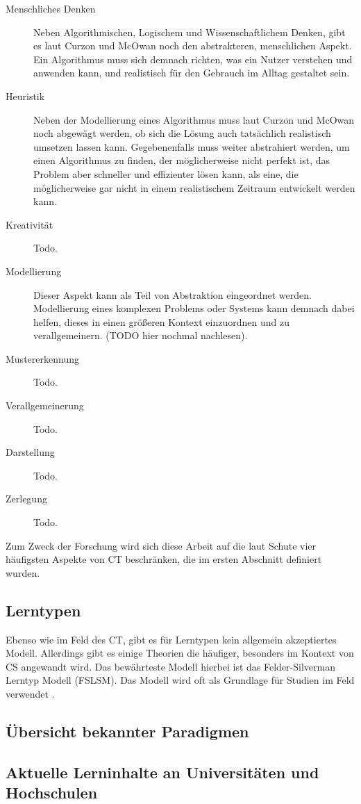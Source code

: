 \begin{description}
    \item[Menschliches Denken] Neben Algorithmischen, Logischem und Wissenschaftlichem Denken, gibt es laut Curzon und McOwan \cite{curzon} noch den abstrakteren, menschlichen Aspekt. Ein Algorithmus muss sich demnach richten, was ein Nutzer verstehen und anwenden kann, und realistisch für den Gebrauch im Alltag gestaltet sein.
    \item[Heuristik] Neben der Modellierung eines Algorithmus muss laut Curzon und McOwan noch abgewägt werden, ob sich die Lösung auch tatsächlich realistisch umsetzen lassen kann. Gegebenenfalls muss weiter abstrahiert werden, um einen Algorithmus zu finden, der möglicherweise nicht perfekt ist, das Problem aber schneller und effizienter lösen kann, als eine, die möglicherweise gar nicht in einem realistischem Zeitraum entwickelt werden kann.
    \item[Kreativität] Todo.
    \item[Modellierung] Dieser Aspekt kann als Teil von Abstraktion eingeordnet werden. Modellierung eines komplexen Problems oder Systems kann demnach dabei helfen, dieses in einen größeren Kontext einzuordnen und zu verallgemeinern. (TODO hier nochmal nachlesen).
    \item[Mustererkennung] Todo.
    \item[Verallgemeinerung] Todo.
    \item[Darstellung] Todo.
    \item[Zerlegung] Todo.
\end{description} 


    Zum Zweck der Forschung wird sich diese Arbeit auf die laut Schute vier häufigsten Aspekte von CT beschränken, die im ersten Abschnitt definiert wurden.

\subsection{Lerntypen}
Ebenso wie im Feld des CT, gibt es für Lerntypen kein allgemein akzeptiertes Modell. Allerdings gibt es einige Theorien die häufiger, besonders im Kontext von CS angewandt wird. Das bewährteste Modell hierbei ist das Felder-Silverman Lerntyp Modell (FSLSM). Das Modell wird oft als Grundlage für Studien im Feld verwendet .

\subsection{Übersicht bekannter Paradigmen}

\subsection{Aktuelle Lerninhalte an Universitäten und Hochschulen}